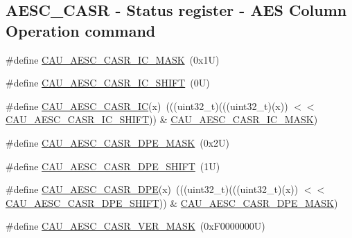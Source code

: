 \subsection*{A\+E\+S\+C\+\_\+\+C\+A\+SR -\/ Status register -\/ A\+ES Column Operation command}
\begin{DoxyCompactItemize}
\item 
\#define \mbox{\hyperlink{group___c_a_u___register___masks_ga1cdbe3e5dcccfef7d740aa8474df5263}{C\+A\+U\+\_\+\+A\+E\+S\+C\+\_\+\+C\+A\+S\+R\+\_\+\+I\+C\+\_\+\+M\+A\+SK}}~(0x1\+U)
\item 
\#define \mbox{\hyperlink{group___c_a_u___register___masks_ga6d38ea3ba55f1a1fdb7f01d217c387ed}{C\+A\+U\+\_\+\+A\+E\+S\+C\+\_\+\+C\+A\+S\+R\+\_\+\+I\+C\+\_\+\+S\+H\+I\+FT}}~(0\+U)
\item 
\#define \mbox{\hyperlink{group___c_a_u___register___masks_ga7fa6b27d2026455ab15e45cc8bb1807d}{C\+A\+U\+\_\+\+A\+E\+S\+C\+\_\+\+C\+A\+S\+R\+\_\+\+IC}}(x)~(((uint32\+\_\+t)(((uint32\+\_\+t)(x)) $<$$<$ \mbox{\hyperlink{group___c_a_u___register___masks_ga6d38ea3ba55f1a1fdb7f01d217c387ed}{C\+A\+U\+\_\+\+A\+E\+S\+C\+\_\+\+C\+A\+S\+R\+\_\+\+I\+C\+\_\+\+S\+H\+I\+FT}})) \& \mbox{\hyperlink{group___c_a_u___register___masks_ga1cdbe3e5dcccfef7d740aa8474df5263}{C\+A\+U\+\_\+\+A\+E\+S\+C\+\_\+\+C\+A\+S\+R\+\_\+\+I\+C\+\_\+\+M\+A\+SK}})
\item 
\#define \mbox{\hyperlink{group___c_a_u___register___masks_ga40583682054346f72ca37860de1406b6}{C\+A\+U\+\_\+\+A\+E\+S\+C\+\_\+\+C\+A\+S\+R\+\_\+\+D\+P\+E\+\_\+\+M\+A\+SK}}~(0x2\+U)
\item 
\#define \mbox{\hyperlink{group___c_a_u___register___masks_gaa13642832bf71bc8d76ef211ee7de360}{C\+A\+U\+\_\+\+A\+E\+S\+C\+\_\+\+C\+A\+S\+R\+\_\+\+D\+P\+E\+\_\+\+S\+H\+I\+FT}}~(1\+U)
\item 
\#define \mbox{\hyperlink{group___c_a_u___register___masks_ga861d5357cd5387b2299e97d63aa7c2d2}{C\+A\+U\+\_\+\+A\+E\+S\+C\+\_\+\+C\+A\+S\+R\+\_\+\+D\+PE}}(x)~(((uint32\+\_\+t)(((uint32\+\_\+t)(x)) $<$$<$ \mbox{\hyperlink{group___c_a_u___register___masks_gaa13642832bf71bc8d76ef211ee7de360}{C\+A\+U\+\_\+\+A\+E\+S\+C\+\_\+\+C\+A\+S\+R\+\_\+\+D\+P\+E\+\_\+\+S\+H\+I\+FT}})) \& \mbox{\hyperlink{group___c_a_u___register___masks_ga40583682054346f72ca37860de1406b6}{C\+A\+U\+\_\+\+A\+E\+S\+C\+\_\+\+C\+A\+S\+R\+\_\+\+D\+P\+E\+\_\+\+M\+A\+SK}})
\item 
\#define \mbox{\hyperlink{group___c_a_u___register___masks_ga5439d1e52f7e2cd76ac43c3a82b251ac}{C\+A\+U\+\_\+\+A\+E\+S\+C\+\_\+\+C\+A\+S\+R\+\_\+\+V\+E\+R\+\_\+\+M\+A\+SK}}~(0x\+F0000000\+U)

\end{DoxyCompactItemize}
